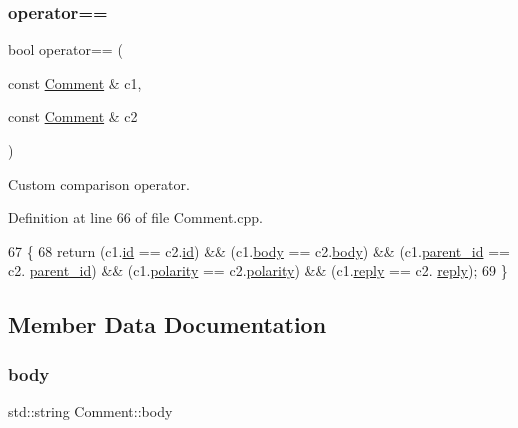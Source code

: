 \subsubsection{\texorpdfstring{operator==}{operator==}}
{\footnotesize\ttfamily bool operator== (\begin{DoxyParamCaption}\item[{const \hyperlink{class_comment}{Comment} \&}]{c1,  }\item[{const \hyperlink{class_comment}{Comment} \&}]{c2 }\end{DoxyParamCaption})\hspace{0.3cm}{\ttfamily [friend]}}



Custom comparison operator. 



Definition at line 66 of file Comment.\+cpp.


\begin{DoxyCode}
67 \{
68     \textcolor{keywordflow}{return} (c1.\hyperlink{class_comment_a63db6067036146247c4ab7f663d90369}{id} == c2.\hyperlink{class_comment_a63db6067036146247c4ab7f663d90369}{id}) && (c1.\hyperlink{class_comment_af8df10ee9d38440d5c4d500ccc9f2519}{body} == c2.\hyperlink{class_comment_af8df10ee9d38440d5c4d500ccc9f2519}{body}) && (c1.\hyperlink{class_comment_abc88c0f64df05cb3d29ad1c7aa1621c5}{parent\_id} == c2.
      \hyperlink{class_comment_abc88c0f64df05cb3d29ad1c7aa1621c5}{parent\_id}) && (c1.\hyperlink{class_comment_a617b67425b39c1f5f1eb0ada3d4bbd74}{polarity} == c2.\hyperlink{class_comment_a617b67425b39c1f5f1eb0ada3d4bbd74}{polarity}) && (c1.\hyperlink{class_comment_a7b8ceeb67364d5e08299baeeff38ba03}{reply} == c2.
      \hyperlink{class_comment_a7b8ceeb67364d5e08299baeeff38ba03}{reply});
69 \}
\end{DoxyCode}


\subsection{Member Data Documentation}
\mbox{\label{class_comment_af8df10ee9d38440d5c4d500ccc9f2519}} 
\subsubsection{\texorpdfstring{body}{body}}
{\footnotesize\ttfamily std\+::string Comment\+::body\hspace{0.3cm}{\ttfamily [private]}}



